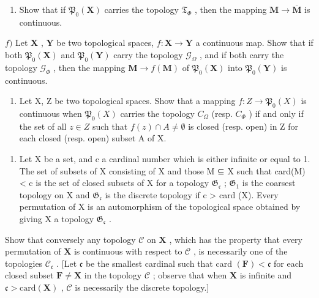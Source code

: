 \begin{enumerate}
\def\labelenumi{\alph{enumi})}
\setcounter{enumi}{4}
\tightlist
\item
  Show that if \(\mathfrak{P}_{0}(\mathbf{X})\) carries the topology \(\mathfrak{T}_{\Phi}\) , then the mapping \(\mathbf{M} \to \overline{\mathbf{M}}\) is continuous.
\end{enumerate}

\(f)\) Let \(\mathbf{X}\) , \(\mathbf{Y}\) be two topological spaces, \(f: \mathbf{X} \to \mathbf{Y}\) a continuous map. Show that if both \(\mathfrak{P}_{0}(\mathbf{X})\) and \(\mathfrak{P}_{0}(\mathbf{Y})\) carry the topology \(\mathcal{G}_{\Omega}\) , and if both carry the topology \(\mathcal{G}_{\Phi}\) , then the mapping \(\mathbf{M} \to f(\mathbf{M})\) of \(\mathfrak{P}_{0}(\mathbf{X})\) into \(\mathfrak{P}_{0}(\mathbf{Y})\) is continuous.

\begin{enumerate}
\def\labelenumi{\alph{enumi})}
\setcounter{enumi}{6}
\tightlist
\item
  Let X, Z be two topological spaces. Show that a mapping \(f: Z \to \mathfrak{P}_{0}(X)\) is continuous when \(\mathfrak{P}_{0}(X)\) carries the topology \(C_{\Omega}\) (resp. \(C_{\Phi}\) ) if and only if the set of all \(z \in Z\) such that \(f(z) \cap A \neq \emptyset\) is closed (resp. open) in Z for each closed (resp. open) subset A of X.
\end{enumerate}

\begin{enumerate}
\def\labelenumi{\arabic{enumi})}
\setcounter{enumi}{7}
\tightlist
\item
  Let X be a set, and c a cardinal number which is either infinite or equal to 1. The set of subsets of X consisting of X and those M ⊆ X such that card(M) \textless{} c is the set of closed subsets of X for a topology \(\mathfrak{G}_{\mathfrak{c}}\) ; \(\mathfrak{G}_{\mathfrak{1}}\) is the coarsest topology on X and \(\mathfrak{G}_{\mathfrak{c}}\) is the discrete topology if c \textgreater{} card (X). Every permutation of X is an automorphism of the topological space obtained by giving X a topology \(\mathfrak{G}_{\mathfrak{c}}\) .
\end{enumerate}

Show that conversely any topology \(\mathcal{C}\) on \(\mathbf{X}\) , which has the property that every permutation of \(\mathbf{X}\) is continuous with respect to \(\mathcal{C}\) , is necessarily one of the topologies \(\mathcal{C}_{\mathfrak{c}}\) . {[}Let \(\mathfrak{c}\) be the smallest cardinal such that card \((\mathbf{F}) < \mathfrak{c}\) for each closed subset \(\mathbf{F} \neq \mathbf{X}\) in the topology \(\mathcal{C}\) ; observe that when \(\mathbf{X}\) is infinite and \(\mathfrak{c} >\mathrm{card}(\mathbf{X})\) , \(\mathcal{C}\) is necessarily the discrete topology.{]}

